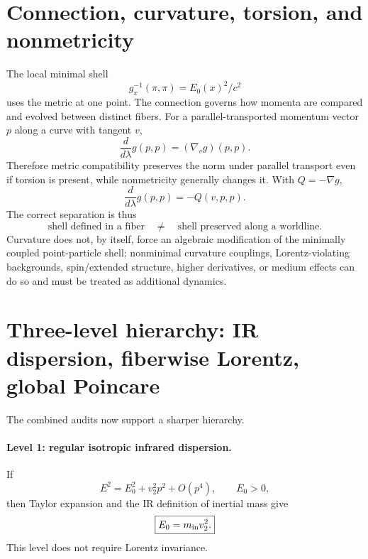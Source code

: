 \documentclass[11pt,a4paper]{article}
\begin{document}
\section{Connection, curvature, torsion, and nonmetricity}
The local minimal shell
\begin{equation}
 g_x^{-1}(\pi,\pi)=E_0(x)^2/c^2
\end{equation}
uses the metric at one point.  The connection governs how momenta are compared and evolved between distinct fibers.  For a parallel-transported momentum vector $p$ along a curve with tangent $v$,
\begin{equation}
 \frac{d}{d\lambda}g(p,p)=(\nabla_v g)(p,p).
\end{equation}
Therefore metric compatibility preserves the norm under parallel transport even if torsion is present, while nonmetricity generally changes it.  With $Q=-\nabla g$,
\begin{equation}
 \frac{d}{d\lambda}g(p,p)=-Q(v,p,p).
\end{equation}
The correct separation is thus
\begin{equation}
 \boxed{\text{shell defined in a fiber}\quad\neq\quad\text{shell preserved along a worldline}.}
\end{equation}
Curvature does not, by itself, force an algebraic modification of the minimally coupled point-particle shell; nonminimal curvature couplings, Lorentz-violating backgrounds, spin/extended structure, higher derivatives, or medium effects can do so and must be treated as additional dynamics.

\section{Three-level hierarchy: IR dispersion, fiberwise Lorentz, global Poincare}
The combined audits now support a sharper hierarchy.

\paragraph{Level 1: regular isotropic infrared dispersion.}
If
\begin{equation}
 E^2=E_0^2+v_2^2p^2+O(p^4),\qquad E_0>0,
\end{equation}
then Taylor expansion and the IR definition of inertial mass give
\begin{equation}
 \boxed{E_0=m_{\rm in}v_2^2.}
\end{equation}
This level does not require Lorentz invariance.
\end{document}
